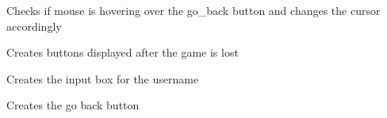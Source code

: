 \documentclass[letterpaper,10pt,english]{sphinxmanual}
\begin{document}
\begin{fulllineitems}
\begin{fulllineitems}
\label{\detokenize{settings:settings.Settings.check_go_back_btn_hover}}
\pysigstartsignatures
{}
\pysigstopsignatures
\sphinxAtStartPar
Checks if mouse is hovering over the go\_back button and changes the cursor accordingly

\end{fulllineitems}


\begin{fulllineitems}
\label{\detokenize{settings:settings.Settings.create_end_of_game_btns}}
\pysigstartsignatures
{}
\pysigstopsignatures
\sphinxAtStartPar
Creates buttons displayed after the game is lost

\end{fulllineitems}


\begin{fulllineitems}
\label{\detokenize{settings:settings.Settings.create_get_username_text}}
\pysigstartsignatures
{}
\pysigstopsignatures
\sphinxAtStartPar
Creates the input box for the username

\end{fulllineitems}


\begin{fulllineitems}
\label{\detokenize{settings:settings.Settings.create_go_back_btn}}
\pysigstartsignatures
{}
\pysigstopsignatures
\sphinxAtStartPar
Creates the go back button

\end{fulllineitems}



\end{fulllineitems}
\end{document}
